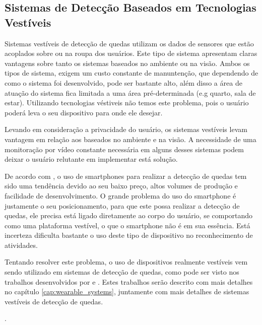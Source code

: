 \subsection{Sistemas de Detecção Baseados em Tecnologias Vestíveis}
Sistemas vestíveis de detecção de quedas utilizam os dados de sensores que estão acoplados sobre ou na roupa dos usuários. Este tipo de sistema apresentam claras vantagens sobre tanto os sistemas baseados no ambiente ou na visão. Ambos os tipos de sistema, exigem um custo constante de manuntenção, que dependendo de como o sistema foi desenvolvido, pode ser bastante alto, além disso a área de atuação do sistema fica limitada a uma área pré-determinada (e.g quarto, sala de estar). Utilizando tecnologias véstiveis não temos este problema, pois o usuário poderá leva o seu dispositivo para onde ele desejar.

Levando em consideração a privacidade do usuário, os sistemas vestíveis levam vantagem em relação aos baseados no ambiente e na visão. A necessidade de uma monitoração por vídeo constante necessária em alguns desses sistemas podem deixar o usuário relutante em implementar está solução. 

De acordo com \cite{igual2013challenges}, o uso de smartphones para realizar a detecção de quedas tem sido uma tendência devido ao seu baixo preço, altos volumes de produção e facilidade de desenvolvimento. O grande problema do uso do smartphone é justamente o seu posicionamento, para que este possa realizar a detecção de quedas, ele precisa está ligado diretamente ao corpo do usuário, se comportando como uma plataforma vestível, o que o smartphone não é em sua essência. Está incerteza dificulta bastante o uso deste tipo de dispositivo no reconhecimento de atividades. 

Tentando resolver este problema, o uso de dispositivos realmente vestíveis vem sendo utilizado em sistemas de detecção de quedas, como pode ser visto nos trabalhos desenvolvidos por \cite{hsieh2014wrist} e \cite{degen2003speedy}. Estes trabalhos serão descrito com mais detalhes no capítulo \ref{cap:wearable_systems}, juntamente com mais detalhes de sistemas vestíveis de detecção de quedas.



.


